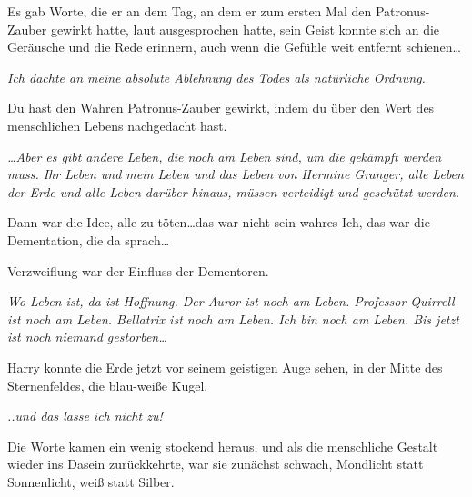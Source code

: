 Es gab Worte, die er an dem Tag, an dem er zum ersten Mal den Patronus-Zauber gewirkt hatte, laut ausgesprochen hatte, sein Geist konnte sich an die Geräusche und die Rede erinnern, auch wenn die Gefühle weit entfernt schienen…

\emph{Ich dachte an meine absolute Ablehnung des Todes als natürliche Ordnung.}

Du hast den Wahren Patronus-Zauber gewirkt, indem du über den Wert des menschlichen Lebens nachgedacht hast.

\emph{…Aber es gibt andere Leben, die noch am Leben sind, um die gekämpft werden muss. Ihr Leben und mein Leben und das Leben von Hermine Granger, alle Leben der Erde und alle Leben darüber hinaus, müssen verteidigt und geschützt werden.}

Dann war die Idee, alle zu töten…das war nicht sein wahres Ich, das war die Dementation, die da sprach…

Verzweiflung war der Einfluss der Dementoren.

\emph{Wo Leben ist, da ist Hoffnung. Der Auror ist noch am Leben. Professor Quirrell ist noch am Leben. Bellatrix ist noch am Leben. Ich bin noch am Leben. Bis jetzt ist noch niemand gestorben…}

Harry konnte die Erde jetzt vor seinem geistigen Auge sehen, in der Mitte des Sternenfeldes, die blau-weiße Kugel.

\emph{..und das lasse ich nicht zu!}


Die Worte kamen ein wenig stockend heraus, und als die menschliche Gestalt wieder ins Dasein zurückkehrte, war sie zunächst schwach, Mondlicht statt Sonnenlicht, weiß statt Silber.

